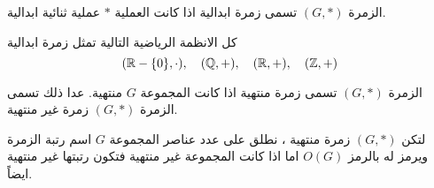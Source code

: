 \begin{definition}
	الزمرة $(G, *)$ تسمى زمرة ابدالية اذا كانت العملية $*$ عملية ثنائية ابدالية.
\end{definition}

\begin{example}
	كل الانظمة الرياضية التالية تمثل زمرة ابدالية
	\[
	(\mathbb{R}-\{0\}, \cdot),\quad (\mathbb{Q}, +) ,\quad (\mathbb{R}, +) ,\quad (\mathbb{Z}, +)
	\]
\end{example}

\begin{definition}
	الزمرة $(G, * )$ تسمى زمرة منتهية اذا كانت المجموعة $G$ منتهية. عدا ذلك تسمى الزمرة $(G, *)$ زمرة غير منتهية. 
\end{definition}

\begin{definition}
	لتكن $(G, *)$ زمرة منتهية ، نطلق على عدد عناصر المجموعة $G$ اسم رتبة الزمرة ويرمز له بالرمز $O(G)$ اما اذا كانت المجموعة غير منتهية فتكون رتبتها غير منتهية ايضاً.
\end{definition}




